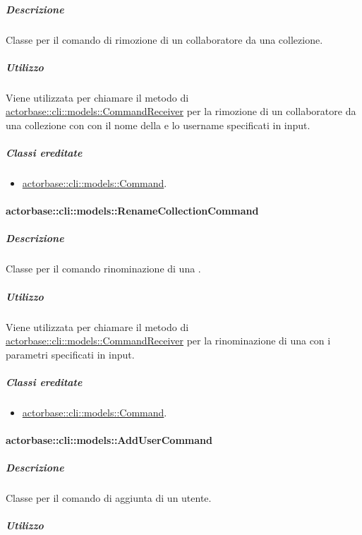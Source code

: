 \documentclass{scalatekids-article}
\begin{document}
\subparagraph{Descrizione}

Classe per il comando di rimozione di un collaboratore da una collezione.

\subparagraph{Utilizzo}

Viene utilizzata per chiamare il metodo di
\hyperref[sec:actorbase::cli::models::CommandReceiver]{actorbase::cli::models::CommandReceiver} per la rimozione di un collaboratore
da una collezione con con il nome della  e lo username
specificati in input.

\subparagraph{Classi ereditate}

\begin{itemize}
\item \hyperref[sec:actorbase::cli::models::Command]{actorbase::cli::models::Command}.
\end{itemize}

\paragraph{actorbase::cli::models::RenameCollectionCommand}
\label{sec:actorbase::cli::models::RenameCollectionCommand}

\subparagraph{Descrizione}

Classe per il comando rinominazione di una .

\subparagraph{Utilizzo}

Viene utilizzata per chiamare il metodo di \hyperref[sec:actorbase::cli::models::CommandReceiver]{actorbase::cli::models::CommandReceiver} per la rinominazione di una  con i parametri specificati in input.

\subparagraph{Classi ereditate}

\begin{itemize}
\item \hyperref[sec:actorbase::cli::models::Command]{actorbase::cli::models::Command}.
\end{itemize}

\paragraph{actorbase::cli::models::AddUserCommand}
\label{sec:actorbase::cli::models::AddUserCommand}

\subparagraph{Descrizione}

Classe per il comando di aggiunta di un utente.

\subparagraph{Utilizzo}
\end{document}
